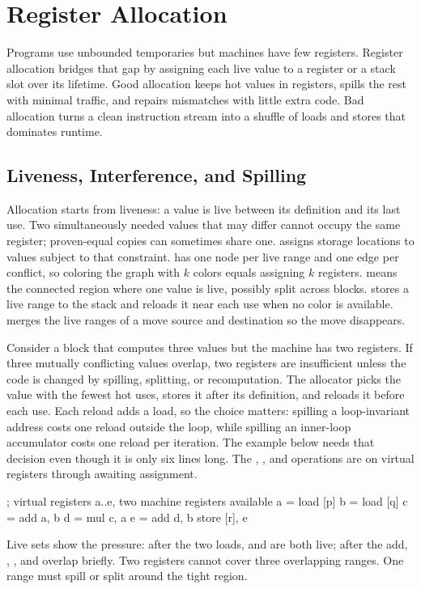 \chapter{Register Allocation}\label{ch:register-allocation}

Programs use unbounded temporaries but machines have few registers.
Register allocation bridges that gap by assigning each live value to a register or a stack slot over its lifetime.
Good allocation keeps hot values in registers, spills the rest with minimal traffic, and repairs mismatches with little extra code.
Bad allocation turns a clean instruction stream into a shuffle of loads and stores that dominates runtime.

\section{Liveness, Interference, and Spilling}\label{sec:ch27-liveness}

Allocation starts from liveness: a value is live between its definition and its last use.
Two simultaneously needed values that may differ cannot occupy the same register; proven-equal copies can sometimes share one.
 assigns storage locations to values subject to that constraint.
 has one node per live range and one edge per conflict, so coloring the graph with $k$ colors equals assigning $k$ registers.
 means the connected region where one value is live, possibly split across blocks.
 stores a live range to the stack and reloads it near each use when no color is available.
 merges the live ranges of a move source and destination so the move disappears.

Consider a block that computes three values but the machine has two registers.
If three mutually conflicting values overlap, two registers are insufficient unless the code is changed by spilling, splitting, or recomputation.
The allocator picks the value with the fewest hot uses, stores it after its definition, and reloads it before each use.
Each reload adds a load, so the choice matters: spilling a loop-invariant address costs one reload outside the loop, while spilling an inner-loop accumulator costs one reload per iteration.
The example below needs that decision even though it is only six lines long.
The , , and  operations are  on virtual registers  through  awaiting assignment.
\begin{irlisting}
; virtual registers a..e, two machine registers available
a = load [p]
b = load [q]
c = add a, b
d = mul c, a
e = add d, b
store [r], e
\end{irlisting}
Live sets show the pressure: after the two loads,  and  are both live; after the add, , , and  overlap briefly.
Two registers cannot cover three overlapping ranges.
One range must spill or split around the tight region.


